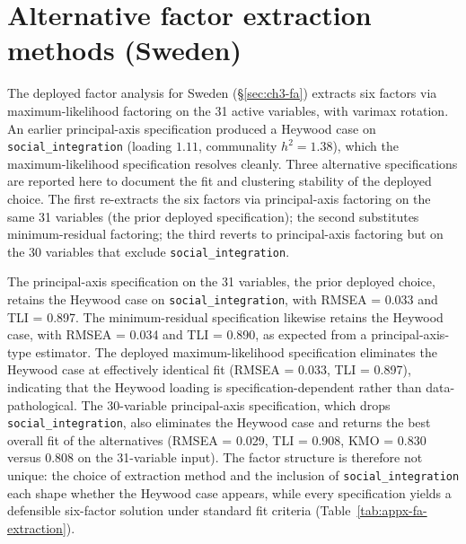 \section{Alternative factor extraction methods (Sweden)}
\label{sec:appx-sens-fa}

The deployed factor analysis for Sweden (\S\ref{sec:ch3-fa}) extracts six factors via maximum-likelihood factoring on the 31 active variables, with varimax rotation. An earlier principal-axis specification produced a Heywood case on \texttt{social\_integration} (loading $1.11$, communality $h^2 = 1.38$), which the maximum-likelihood specification resolves cleanly. Three alternative specifications are reported here to document the fit and clustering stability of the deployed choice. The first re-extracts the six factors via principal-axis factoring on the same 31 variables (the prior deployed specification); the second substitutes minimum-residual factoring; the third reverts to principal-axis factoring but on the 30 variables that exclude \texttt{social\_integration}.

The principal-axis specification on the 31 variables, the prior deployed choice, retains the Heywood case on \texttt{social\_integration}, with RMSEA = 0.033 and TLI = 0.897. The minimum-residual specification likewise retains the Heywood case, with RMSEA = 0.034 and TLI = 0.890, as expected from a principal-axis-type estimator. The deployed maximum-likelihood specification eliminates the Heywood case at effectively identical fit (RMSEA = 0.033, TLI = 0.897), indicating that the Heywood loading is specification-dependent rather than data-pathological. The 30-variable principal-axis specification, which drops \texttt{social\_integration}, also eliminates the Heywood case and returns the best overall fit of the alternatives (RMSEA = 0.029, TLI = 0.908, KMO = 0.830 versus 0.808 on the 31-variable input). The factor structure is therefore not unique: the choice of extraction method and the inclusion of \texttt{social\_integration} each shape whether the Heywood case appears, while every specification yields a defensible six-factor solution under standard fit criteria (Table~\ref{tab:appx-fa-extraction}).

